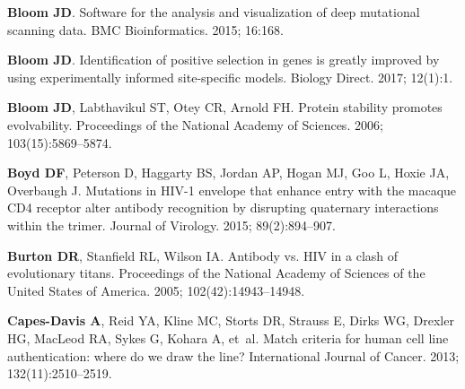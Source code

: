 \documentclass[9pt]{elife}
\begin{document}
\begin{thebibliography}{114}
\textbf{\color{eLifeMediumGrey} Bloom JD}.
\newblock Software for the analysis and visualization of deep mutational
  scanning data.
\newblock BMC Bioinformatics.  2015; 16:168.

\textbf{\color{eLifeMediumGrey} Bloom JD}.
\newblock Identification of positive selection in genes is greatly improved by
  using experimentally informed site-specific models.
\newblock Biology Direct.  2017; 12(1):1.

\textbf{\color{eLifeMediumGrey} Bloom JD}, Labthavikul ST, Otey CR, Arnold FH.
\newblock Protein stability promotes evolvability.
\newblock Proceedings of the National Academy of Sciences.  2006;
  103(15):5869--5874.

\textbf{\color{eLifeMediumGrey} Boyd DF}, Peterson D, Haggarty BS, Jordan AP,
  Hogan MJ, Goo L, Hoxie JA, Overbaugh J.
\newblock Mutations in HIV-1 envelope that enhance entry with the macaque CD4
  receptor alter antibody recognition by disrupting quaternary interactions
  within the trimer.
\newblock Journal of Virology.  2015; 89(2):894--907.

\textbf{\color{eLifeMediumGrey} Burton DR}, Stanfield RL, Wilson IA.
\newblock Antibody vs. HIV in a clash of evolutionary titans.
\newblock Proceedings of the National Academy of Sciences of the United States
  of America.  2005; 102(42):14943--14948.
  
\textbf{\color{eLifeMediumGrey} Capes-Davis A}, Reid YA, Kline MC, Storts DR,
  Strauss E, Dirks WG, Drexler HG, MacLeod RA, Sykes G, Kohara A, et~al.
\newblock Match criteria for human cell line authentication: where do we draw
  the line?
\newblock International Journal of Cancer.  2013; 132(11):2510--2519.


\end{thebibliography}
\end{document}
